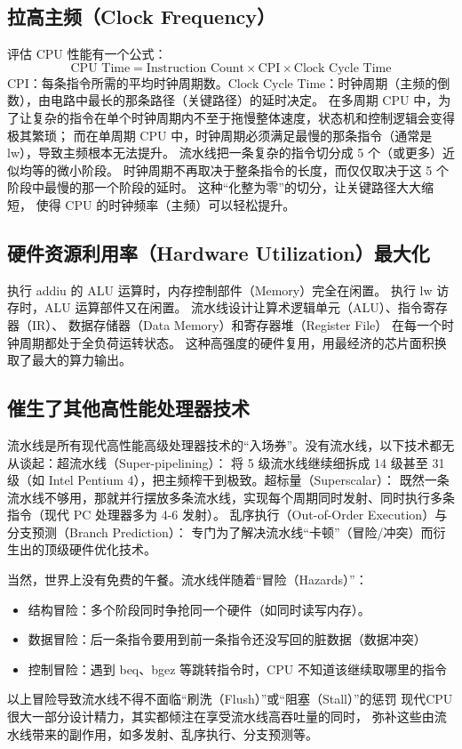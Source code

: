 ﻿\documentclass{article}
\begin{document}
\subsection{拉高主频（Clock Frequency）}
评估 CPU 性能有一个公式：
$$\text{CPU Time} = \text{Instruction Count} \times \text{CPI} \times \text{Clock Cycle Time}$$$\text{CPI}$：每条指令所需的平均时钟周期数。$\text{Clock Cycle Time}$：时钟周期（主频的倒数），由电路中最长的那条路径（关键路径）的延时决定。
在多周期 CPU 中，为了让复杂的指令在单个时钟周期内不至于拖慢整体速度，状态机和控制逻辑会变得极其繁琐；
而在单周期 CPU 中，时钟周期必须满足最慢的那条指令（通常是 lw），导致主频根本无法提升。
流水线把一条复杂的指令切分成 5 个（或更多）近似均等的微小阶段。
时钟周期不再取决于整条指令的长度，而仅仅取决于这 5 个阶段中最慢的那一个阶段的延时。
这种“化整为零”的切分，让关键路径大大缩短，
使得 CPU 的时钟频率（主频）可以轻松提升。

\subsection{硬件资源利用率（Hardware Utilization）最大化}
执行 addiu 的 ALU 运算时，内存控制部件（Memory）完全在闲置。  
执行 lw 访存时，ALU 运算部件又在闲置。  
流水线设计让算术逻辑单元（ALU）、指令寄存器（IR）、
数据存储器（Data Memory）和寄存器堆（Register File）
在每一个时钟周期都处于全负荷运转状态。
这种高强度的硬件复用，用最经济的芯片面积换取了最大的算力输出。

\subsection{催生了其他高性能处理器技术}
流水线是所有现代高性能高级处理器技术的“入场券”。没有流水线，以下技术都无从谈起：超流水线（Super-pipelining）： 将 5 级流水线继续细拆成 14 级甚至 31 级（如 Intel Pentium 4），把主频榨干到极致。超标量（Superscalar）： 
既然一条流水线不够用，那就并行摆放多条流水线，实现每个周期同时发射、同时执行多条指令（现代 PC 处理器多为 4-6 发射）。
乱序执行（Out-of-Order Execution）与分支预测（Branch Prediction）： 专门为了解决流水线“卡顿”（冒险/冲突）而衍生出的顶级硬件优化技术。


当然，世界上没有免费的午餐。流水线伴随着“冒险（Hazards）”：
\begin{itemize}
  \item 结构冒险：多个阶段同时争抢同一个硬件（如同时读写内存）。
  \item 数据冒险：后一条指令要用到前一条指令还没写回的脏数据（数据冲突）  
  \item 控制冒险：遇到 beq、bgez 等跳转指令时，CPU 不知道该继续取哪里的指令
\end{itemize}
以上冒险导致流水线不得不面临“刷洗（Flush）”或“阻塞（Stall）”的惩罚  
现代CPU很大一部分设计精力，其实都倾注在享受流水线高吞吐量的同时，
弥补这些由流水线带来的副作用，如多发射、乱序执行、分支预测等。
\end{document}
